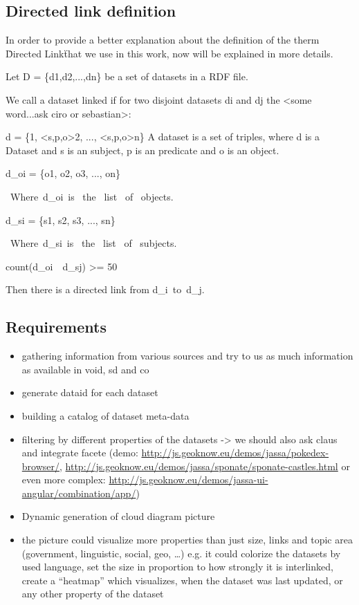 \documentclass{iosart2c}
\begin{document}
\subsection{Directed link definition}
In order to provide a better explanation about the definition of the therm \"Directed Link\" that we use in this work, now will be explained in more details.

Let D = \{d1,d2,...,dn\} be a set of datasets in a RDF file.

We call a dataset linked if for two disjoint datasets di and dj the <some word...ask ciro or sebastian>:

d = \{<s,p,o>1, <s,p,o>2, ..., <s,p,o>n\} A dataset is a set of triples, where d is a Dataset and s is an subject, p is an  predicate and o is an object.

d_{oi} = \{o1, o2, o3, ..., on\} 

~Where~d_{oi}~is~ the~ list~ of~ objects.

d_{si} = \{s1, s2, s3, ..., sn\}

~Where~d_{si}~is~ the~ list~ of~ subjects.

count(d_{oi}~\bigcap~d_{sj}) >= 50

Then there is a directed link from d_{i}~to~d_{j}.

\subsection{Requirements}

\begin{itemize}
\item gathering information from various sources and try to us as much information as available in void, sd and co
\item generate dataid for each dataset
\item building a catalog of dataset meta-data
\item filtering by different properties of the datasets -> we should also ask claus and integrate facete (demo: \url{http://js.geoknow.eu/demos/jassa/pokedex-browser/}, \url{http://js.geoknow.eu/demos/jassa/sponate/sponate-castles.html} or even more complex: \url{http://js.geoknow.eu/demos/jassa-ui-angular/combination/app/})
\item Dynamic generation of cloud diagram picture
\item the picture could visualize more properties than just size, links and topic area (government, linguistic, social, geo, …) e.g. it could colorize the datasets by used language, set the size in proportion to how strongly it is interlinked, create a “heatmap” which visualizes, when the dataset was last updated, or any other property of the dataset
\end{itemize}
\end{document}
